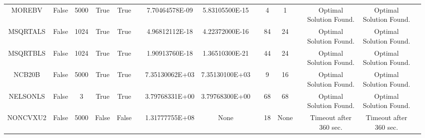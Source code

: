 \begin{longtable}{ccccccccccccccc}
	\cellcolor{default2} MOREBV& \cellcolor{default2} False& \cellcolor{default2} 5000& \cellcolor{default2} True& \cellcolor{default2} True& \cellcolor{header} & \cellcolor{ok} 7.70464578E-09& \cellcolor{best} 5.83105500E-15& \cellcolor{header} & \cellcolor{poor} 4& \cellcolor{best} 1& \cellcolor{header} & \cellcolor{default2} Optimal Solution Found.& \cellcolor{default2} Optimal Solution Found.& \cellcolor{header} \\
	\cellcolor{default1} MSQRTALS& \cellcolor{default1} False& \cellcolor{default1} 1024& \cellcolor{default1} True& \cellcolor{default1} True& \cellcolor{header} & \cellcolor{best} 4.96812112E-18& \cellcolor{ok} 4.22372000E-16& \cellcolor{header} & \cellcolor{poor} 84& \cellcolor{best} 24& \cellcolor{header} & \cellcolor{default1} Optimal Solution Found.& \cellcolor{default1} Optimal Solution Found.& \cellcolor{header} \\
	\cellcolor{default2} MSQRTBLS& \cellcolor{default2} False& \cellcolor{default2} 1024& \cellcolor{default2} True& \cellcolor{default2} True& \cellcolor{header} & \cellcolor{ok} 1.90913760E-18& \cellcolor{best} 1.36510300E-21& \cellcolor{header} & \cellcolor{ok} 44& \cellcolor{best} 24& \cellcolor{header} & \cellcolor{default2} Optimal Solution Found.& \cellcolor{default2} Optimal Solution Found.& \cellcolor{header} \\
	\cellcolor{default1} NCB20B& \cellcolor{default1} False& \cellcolor{default1} 5000& \cellcolor{default1} True& \cellcolor{default1} True& \cellcolor{header} & \cellcolor{best} 7.35130062E+03& \cellcolor{ok} 7.35130100E+03& \cellcolor{header} & \cellcolor{best} 9& \cellcolor{ok} 16& \cellcolor{header} & \cellcolor{default1} Optimal Solution Found.& \cellcolor{default1} Optimal Solution Found.& \cellcolor{header} \\
	\cellcolor{default2} NELSONLS& \cellcolor{default2} False& \cellcolor{default2} 3& \cellcolor{default2} True& \cellcolor{default2} True& \cellcolor{header} & \cellcolor{ok} 3.79768331E+00& \cellcolor{best} 3.79768300E+00& \cellcolor{header} & \cellcolor{best} 68& \cellcolor{best} 68& \cellcolor{header} & \cellcolor{default2} Optimal Solution Found.& \cellcolor{default2} Optimal Solution Found.& \cellcolor{header} \\
	\cellcolor{default1} NONCVXU2& \cellcolor{default1} False& \cellcolor{default1} 5000& \cellcolor{default1} False& \cellcolor{default1} False& \cellcolor{header} & \cellcolor{best} 1.31777755E+08& \cellcolor{err} None& \cellcolor{header} & \cellcolor{best} 18& \cellcolor{err} None& \cellcolor{header} & \cellcolor{default1} Timeout after 360 sec.& \cellcolor{default1} Timeout after 360 sec.& \cellcolor{header} \\

\end{longtable}

